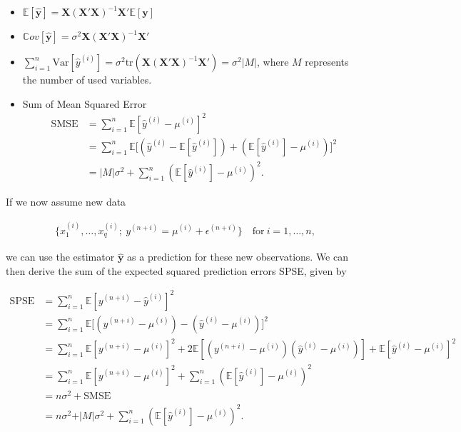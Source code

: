 \documentclass[10pt,a4paper]{article}
\begin{document}
\begin{itemize}
	\item $\mathbb{E} [\boldsymbol{\hat{y}}] = \boldsymbol{X}(\boldsymbol{X}'\boldsymbol{X})^{-1}\boldsymbol{X}'\mathbb{E}[\boldsymbol{y}]$
	\item $\mathbb Cov[\boldsymbol{\hat{y}}] = \sigma^2 \boldsymbol{X}(\boldsymbol{X}'\boldsymbol{X})^{-1}\boldsymbol{X}'$
	\item $\sum_{i=1}^n \text{Var} [\hat y^{(i)}] = \sigma^2 \text{tr}(\boldsymbol{X}(\boldsymbol{X}'\boldsymbol{X})^{-1}\boldsymbol{X}') = \sigma^2 \vert M \vert $, where $M$ represents the number  of used variables.
	\item Sum of Mean Squared Error
		\begin{equation}  
		\begin{split} 
		\text{SMSE} &= \sum_{i=1}^n \mathbb{E}[\hat y^{(i)} - \mu^{(i)}]^2 \\
				    &= \sum_{i=1}^n \mathbb{E}\big[(\hat y^{(i)} - \mathbb{E}[\hat y^{(i)}]) + (\mathbb{E}[\hat y^{(i)}] - \mu^{(i)}) \big]^2 \\
				    &= \vert M \vert\sigma^2 + \sum_{i=1}^n(\mathbb{E}[\hat y^{(i)}] - \mu^{(i)})^2.
		\end{split}
		\end{equation}
\end{itemize}

If we now assume new data 

\begin{align} \label{eq:new_data}
	\{ x^{(i)}_{1}, \dots, x^{(i)}_{q}; \ y^{(n+i)} = \mu^{(i)} + \epsilon^{(n+i)}\} \quad \text{for} \ i = 1, \dots, n,
\end{align}

we can use the estimator $\boldsymbol{\hat{y}}$ as a prediction for these new observations. We can then derive the sum of the expected squared prediction errors SPSE, given by

\begin{equation}
\begin{split}
	\text{SPSE} &= \sum_{i=1}^{n} \mathbb{E}[y^{(n+i)} - \hat y^{(i)}]^2 \\ 
				&= \sum_{i=1}^{n} \mathbb{E}\big[(y^{(n+i)} - \mu^{(i)}) - (\hat y^{(i)} - \mu^{(i)})\big]^2 \\ 
				&= \sum_{i=1}^{n} \mathbb{E}[y^{(n+i)} - \mu^{(i)}]^2 + 2\mathbb{E}[(y^{(n+i)} - \mu^{(i)})(\hat y^{(i)} - \mu^{(i)})] + \mathbb{E}[\hat y^{(i)} - \mu^{(i)}]^2 \\
				&= \sum_{i=1}^{n}\mathbb{E}[y^{(n+i)} - \mu^{(i)}]^2 + \sum_{i=1}^{n}(\mathbb{E}[\hat y^{(i)}] - \mu^{(i)})^2 \\ 
				&= n\sigma^2 + \text{SMSE} \\ 
				&= n\sigma^2 + \vert M \vert \sigma^2 + \sum_{i=1}^{n}(\mathbb{E}[\hat y^{(i)}] - \mu^{(i)})^2.
\end{split}
\end{equation}
\end{document}
